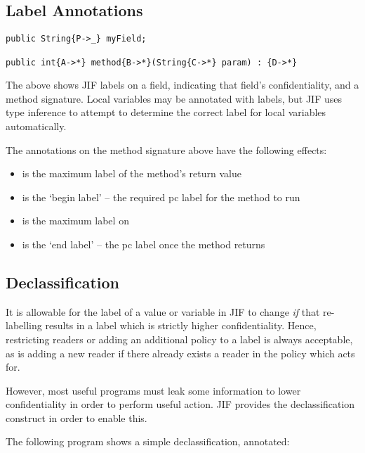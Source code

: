 \subsection{Label Annotations}

\begin{verbatim}
public String{P->_} myField;

public int{A->*} method{B->*}(String{C->*} param) : {D->*}
\end{verbatim}

The above shows JIF labels on a field, indicating that field's confidentiality, and a method signature. Local variables may be annotated with labels, but JIF uses type inference to attempt to determine the correct label for local variables automatically.

The annotations on the method signature above have the following effects:

\begin{itemize}
	\item {} is the maximum label of the method's return value
	
	\item {} is the `begin label' -- the required pc label for the method to run
	
	\item {} is the maximum label on 
	
	\item {} is the `end label' -- the pc label once the method returns
\end{itemize}

\newpage

\subsection{Declassification}

It is allowable for the label of a value or variable in JIF to change \textit{if} that re-labelling results in a label which is strictly higher confidentiality. Hence, restricting readers or adding an additional policy to a label is always acceptable, as is adding a new reader  if there already exists a reader in the policy which  acts for.

However, most useful programs must leak some information to lower confidentiality in order to perform useful action. JIF provides the declassification construct in order to enable this.

The following program shows a simple declassification, annotated:

